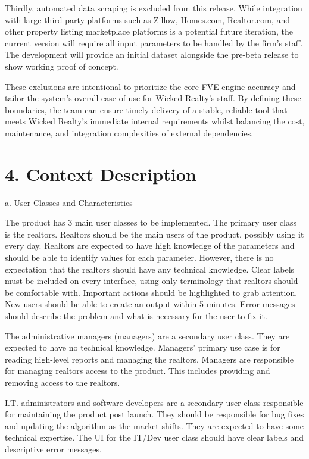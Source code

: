 \documentclass[
]{article}
\begin{document}
Thirdly, automated data scraping is excluded from this release. While
integration with large third-party platforms such as Zillow, Homes.com,
Realtor.com, and other property listing marketplace platforms is a
potential future iteration, the current version will require all input
parameters to be handled by the firm's staff. The development will
provide an initial dataset alongside the pre-beta release to show
working proof of concept.

These exclusions are intentional to prioritize the core FVE engine
accuracy and tailor the system's overall ease of use for Wicked Realty's
staff. By defining these boundaries, the team can ensure timely delivery
of a stable, reliable tool that meets Wicked Realty's immediate internal
requirements whilst balancing the cost, maintenance, and integration
complexities of external dependencies.

\hypertarget{context-description}{%
\section{4. Context Description}\label{context-description}}

a. User Classes and Characteristics

The product has 3 main user classes to be implemented. The primary user
class is the realtors. Realtors should be the main users of the product,
possibly using it every day. Realtors are expected to have high
knowledge of the parameters and should be able to identify values for
each parameter. However, there is no expectation that the realtors
should have any technical knowledge. Clear labels must be included on
every interface, using only terminology that realtors should be
comfortable with. Important actions should be highlighted to grab
attention. New users should be able to create an output within 5
minutes. Error messages should describe the problem and what is
necessary for the user to fix it.

The administrative managers (managers) are a secondary user class. They
are expected to have no technical knowledge. Managers' primary use case
is for reading high-level reports and managing the realtors. Managers
are responsible for managing realtors\textquotesingle{} access to the
product. This includes providing and removing access to the realtors.

I.T. administrators and software developers are a secondary user class
responsible for maintaining the product post launch. They should be
responsible for bug fixes and updating the algorithm as the market
shifts. They are expected to have some technical expertise. The UI for
the IT/Dev user class should have clear labels and descriptive error
messages.
\end{document}
